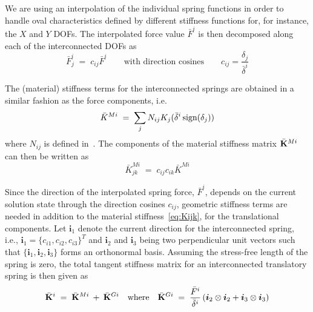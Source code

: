We are using an interpolation of the individual spring functions in order to
handle oval characteristics defined by different stiffness functions for,
for instance, the $X$ and $Y$ DOFs.
The interpolated force value $\bar F^i$ is then decomposed along each of the
interconnected DOFs as
%
\begin{equation}
\bar F^i_j \;=\; c_{ij}\bar F^i \qquad\text{with direction cosines}\qquad
c_{ij} = \frac{\delta_j}{\bar\delta^i}
\label{eq:interconnected force}
\end{equation}
%

The (material) stiffness terms for the interconnected springs are obtained in a
similar fashion as the force components, i.e.
%
\begin{equation}
\bar K^{Mi} \;=\; \sum_j N_{ij} K_j(\bar\delta^i\,\text{sign}(\delta_j))
\end{equation}
%
where $N_{ij}$ is defined in~.
The components of the material stiffness matrix $\bar{\bf K}^{Mi}$
can then be written as
%
\begin{equation}
\label{eq:Kijk}
\bar K^{Mi}_{jk} \;=\; c_{ij} c_{ik} \bar K^{Mi}
\end{equation}

Since the direction of the interpolated spring force, $\bar F^i$,
depends on the current solution state through the direction cosines $c_{ij}$,
geometric stiffness terms are needed in addition to the material
stiffness~\eqref{eq:Kijk}, for the translational components.
Let $\bm{i}_1$ denote the current direction for the interconnected spring, i.e.,
$\bm{i}_1=\{c_{i1},c_{i2},c_{i3}\}^T$ and $\bm{i}_2$ and $\bm{i}_3$ being two
perpendicular unit vectors such that $\{\bm{i}_1,\bm{i}_2,\bm{i}_3\}$ forms an
orthonormal basis.
Assuming the stress-free length of the spring is zero, the total tangent
stiffness matrix for an interconnected translatory spring is then given as
%
\begin{equation}
\label{eq:springKbar3D}
\bar{\bf K}^i \;=\; \bar{\bf K}^{Mi} \:+\: \bar{\bf K}^{Gi}
\quad\mbox{where}\quad \bar{\bf K}^{Gi} \;=\;
\frac{\bar F^i}{\bar\delta^i}
\left(\mbox{\boldmath $i$}_2\otimes\mbox{\boldmath $i$}_2 + \mbox{\boldmath $i$}_3\otimes\mbox{\boldmath $i$}_3\right)
\end{equation}

